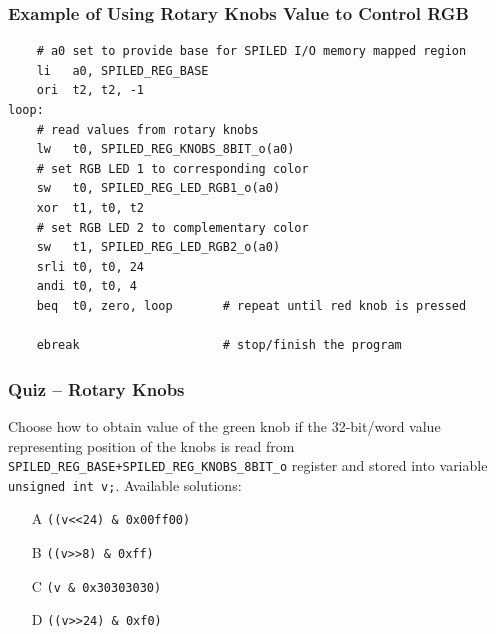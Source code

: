 \documentclass{beamer}
\begin{document}
\begin{frame}[fragile]
\frametitle{Example of Using Rotary Knobs Value to Control RGB}

\begin{verbatim}
    # a0 set to provide base for SPILED I/O memory mapped region
    li   a0, SPILED_REG_BASE
    ori  t2, t2, -1
loop:
    # read values from rotary knobs
    lw   t0, SPILED_REG_KNOBS_8BIT_o(a0)
    # set RGB LED 1 to corresponding color
    sw   t0, SPILED_REG_LED_RGB1_o(a0)
    xor  t1, t0, t2
    # set RGB LED 2 to complementary color
    sw   t1, SPILED_REG_LED_RGB2_o(a0)
    srli t0, t0, 24
    andi t0, t0, 4
    beq  t0, zero, loop       # repeat until red knob is pressed

    ebreak                    # stop/finish the program
\end{verbatim}
\end{frame}

\begin{frame}
\frametitle{Quiz -- Rotary Knobs}

Choose how to obtain value of the green knob if the 32-bit/word value representing position of the knobs is read from \texttt{SPILED\_REG\_BASE+SPILED\_REG\_KNOBS\_8BIT\_o} register  and stored into variable \texttt{unsigned int v;}. Available solutions:
\begin{itemize}
\item[A] \texttt{((v<<24) \& 0x00ff00)}
\item[B] \texttt{((v>>8) \& 0xff)}
\item[C] \texttt{(v \& 0x30303030)}
\item[D] \texttt{((v>>24) \& 0xf0)}
\end{itemize}
\end{frame}
\end{document}
